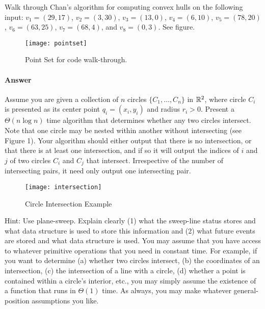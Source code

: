 \documentclass{article}
\begin{document}
\collab{\todo{}}

Walk through Chan's algorithm for computing convex hulls on the following input:
$v_1=(29,17)$, $v_2=(3,30)$,
$v_3=(13,0)$, $v_4=(6,10)$,
$v_5=(78,20)$, $v_6=(63,25)$,
$v_7=(68,4)$, and $v_8=(0,3)$.  See figure.
\begin{figure}[h]
    \centering
    \texttt{[image: pointset]}
    \caption{Point Set for code walk-through.}
\end{figure}



\paragraph{Answer}


\collab{\todo{}}

Assume you are given a collection of $n$ circles $\{C_1 , \ldots , C_n \}$ in
${\mathbb R}^2$, where circle $C_i$ is presented as its center point $q_i = (x_i, y_i)$
and radius $r_i > 0$. Present a $\Theta(n \log n)$ time algorithm that determines
whether any two circles intersect. Note that one circle may be nested within
another without intersecting (see Figure 1). Your algorithm should either output
that there is no intersection, or that there is at least one intersection, and
if so it will output the indices of $i$ and $j$ of two circles $C_i$ and $C_j$
that intersect. Irrespective of the number of intersecting pairs, it need only
output one intersecting pair.

\begin{figure}[h]
    \centering
    \texttt{[image: intersection]}
    \caption{Circle Intersection Example}
\end{figure}

Hint: Use plane-sweep. Explain clearly (1) what the sweep-line status stores and
what data structure is used to store this information and (2) what future events
are stored and what data structure is used. You may assume that you have access
to whatever primitive operations that you need in constant time. For example, if
you want to determine (a) whether two circles intersect, (b) the coordinates of
an intersection, (c) the intersection of a line with a circle, (d) whether a
point is contained within a circle's interior, etc., you may simply assume the
existence of a function that runs in $\Theta(1)$ time. As always, you may make
whatever general-position assumptions you like.
\end{document}
